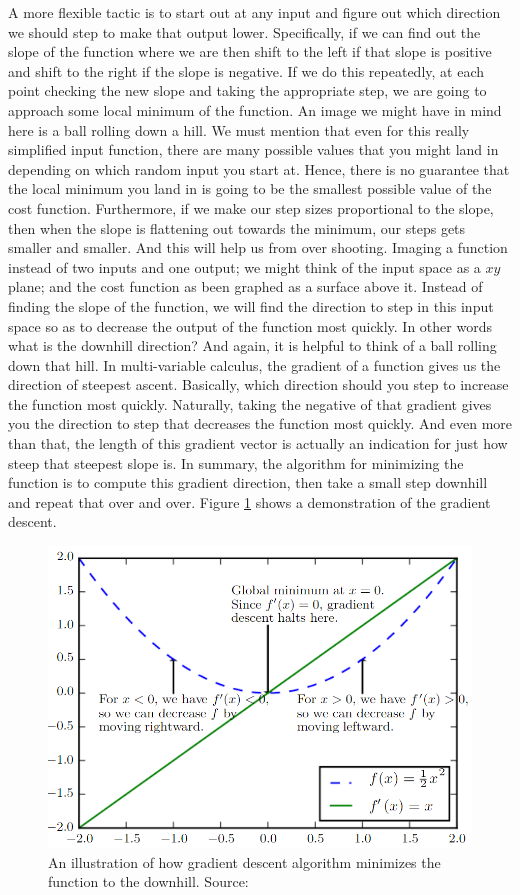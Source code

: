 \documentclass[master]{thesis-uestc}
\begin{document}
A more flexible tactic is to start out at any input and figure out which direction we should step to make that output lower. Specifically, if we can find out the slope of the function where we are then shift to the left if that slope is positive and shift to the right if the slope is negative. If we do this repeatedly, at each point checking the new slope and taking the appropriate step, we are going to approach some local minimum of the function. An image we might have in mind here is a ball rolling down a hill. We must mention that even for this really simplified input function, there are many possible values that you might land in depending on which random input you start at. Hence, there is no guarantee that the local minimum you land in is going to be the smallest possible value of the cost function. Furthermore, if we make our step sizes proportional to the slope, then when the slope is flattening out towards the minimum, our steps gets smaller and smaller. And this will help us from over shooting.
Imaging a function instead of two inputs and one output; we might think of the input space as a $xy$ plane; and the cost function as been graphed as a surface above it. Instead of finding the slope of the function, we will find the direction to step in this input space so as to decrease the output of the function most quickly. In other words what is the downhill direction? And again, it is helpful to think of a ball rolling down that hill. In multi-variable calculus, the gradient of a function gives us the direction of steepest ascent. Basically, which direction should you step to increase the function most quickly. Naturally, taking the negative of that gradient gives you the direction to step that decreases the function most quickly. And even more than that, the length of this gradient vector is actually an indication for just how steep that steepest slope is. In summary, the algorithm for minimizing the function is to compute this gradient direction, then take a small step downhill and repeat that over and over.
Figure \ref{fig_gradient_descent} shows a demonstration of the gradient descent.
\begin{figure}[ht]
\includegraphics[width=5in]{pic/gradient_descent.PNG}
\caption{An illustration of how gradient descent algorithm minimizes the function to the downhill. Source: \cite{Goodfellow-et-al-2016}}
\label{fig_gradient_descent}
\end{figure}
\end{document}
